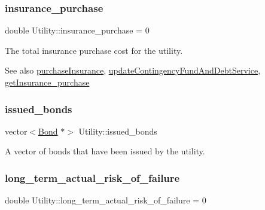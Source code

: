 \subsubsection{\texorpdfstring{insurance\+\_\+purchase}{insurance\_purchase}}
{\footnotesize\ttfamily double Utility\+::insurance\+\_\+purchase = 0\hspace{0.3cm}{\ttfamily [private]}}



The total insurance purchase cost for the utility. 

\begin{DoxySeeAlso}{See also}
\mbox{\hyperlink{classUtility_a97073e3d7a30275c639484b3158284fa}{purchase\+Insurance}}, \mbox{\hyperlink{classUtility_ab663efd526505a3d843cae7075cc3b91}{update\+Contingency\+Fund\+And\+Debt\+Service}}, \mbox{\hyperlink{classUtility_aa9a26e9b3b5af555c8278330c9f4a468}{get\+Insurance\+\_\+purchase}} 
\end{DoxySeeAlso}
\mbox{\label{classUtility_ae100f50a95593230b2571bb746364186}} 
\subsubsection{\texorpdfstring{issued\+\_\+bonds}{issued\_bonds}}
{\footnotesize\ttfamily vector$<$\mbox{\hyperlink{classBond}{Bond}} $\ast$$>$ Utility\+::issued\+\_\+bonds\hspace{0.3cm}{\ttfamily [private]}}



A vector of bonds that have been issued by the utility. 

\mbox{\label{classUtility_ab7b07d7ebc509ce9fb1ec34c0b756aad}} 
\subsubsection{\texorpdfstring{long\+\_\+term\+\_\+actual\+\_\+risk\+\_\+of\+\_\+failure}{long\_term\_actual\_risk\_of\_failure}}
{\footnotesize\ttfamily double Utility\+::long\+\_\+term\+\_\+actual\+\_\+risk\+\_\+of\+\_\+failure = 0\hspace{0.3cm}{\ttfamily [private]}}



